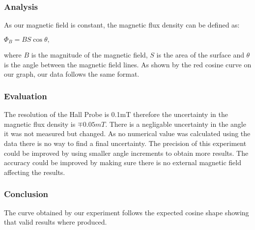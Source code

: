\subsubsection{Analysis}
As our magnetic field is constant, the magnetic flux density can be defined as:
\begin{center}
  $\Phi_B=BS\cos{\theta},$
\end{center}
where $B$ is the magnitude of the magnetic field, $S$ is the area of the surface and $\theta$ is the angle between the magnetic field lines.
As shown by the red cosine curve on our graph, our data follows the same format.

\subsubsection{Evaluation}
The resolution of the Hall Probe is 0.1mT therefore the uncertainty in the magnetic flux density is $\mp 0.05mT$.
There is a negligable uncertainty in the angle it was not measured but changed.
As no numerical value was calculated using the data there is no way to find a final uncertainty.
The precision of this experiment could be improved by using smaller angle increments to obtain more results.
The accuracy could be improved by making sure there is no external magnetic field affecting the results.

\subsubsection{Conclusion}
The curve obtained by our experiment follows the expected cosine shape showing that valid results where produced.
